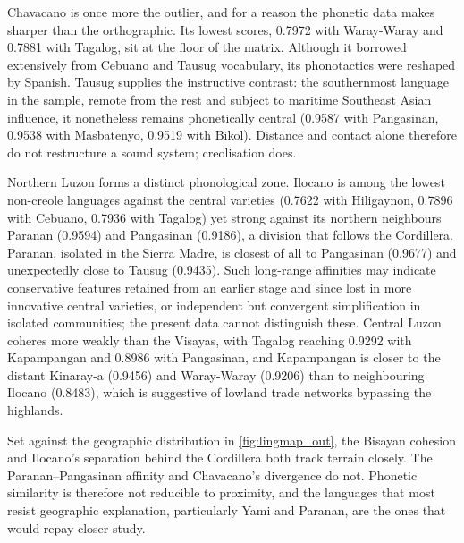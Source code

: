 Chavacano is once more the outlier, and for a reason the phonetic data makes
sharper than the orthographic. Its lowest scores, 0.7972 with Waray-Waray and
0.7881 with Tagalog, sit at the floor of the matrix. Although it borrowed
extensively from Cebuano and Tausug vocabulary, its phonotactics were reshaped
by Spanish. Tausug supplies the instructive contrast: the southernmost language
in the sample, remote from the rest and subject to maritime Southeast Asian
influence, it nonetheless remains phonetically central (0.9587 with Pangasinan,
0.9538 with Masbatenyo, 0.9519 with Bikol). Distance and contact alone therefore
do not restructure a sound system; creolisation does.

Northern Luzon forms a distinct phonological zone. Ilocano is among the lowest
non-creole languages against the central varieties (0.7622 with Hiligaynon,
0.7896 with Cebuano, 0.7936 with Tagalog) yet strong against its northern
neighbours Paranan (0.9594) and Pangasinan (0.9186), a division that follows the
Cordillera. Paranan, isolated in the Sierra Madre, is closest of all to
Pangasinan (0.9677) and unexpectedly close to Tausug (0.9435). Such long-range
affinities may indicate conservative features retained from an earlier stage and
since lost in more innovative central varieties, or independent but convergent
simplification in isolated communities; the present data cannot distinguish
these. Central Luzon coheres more weakly than the Visayas, with Tagalog reaching
0.9292 with Kapampangan and 0.8986 with Pangasinan, and Kapampangan is closer to
the distant Kinaray-a (0.9456) and Waray-Waray (0.9206) than to neighbouring
Ilocano (0.8483), which is suggestive of lowland trade networks bypassing the
highlands.

Set against the geographic distribution in \cref{fig:lingmap_out}, the Bisayan
cohesion and Ilocano's separation behind the Cordillera both track terrain
closely. The Paranan--Pangasinan affinity and Chavacano's divergence do not.
Phonetic similarity is therefore not reducible to proximity, and the languages
that most resist geographic explanation, particularly Yami and Paranan, are the
ones that would repay closer study.